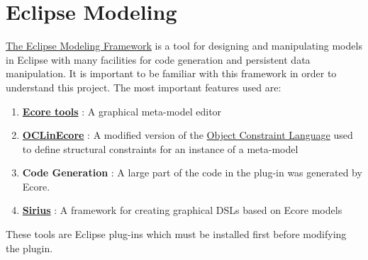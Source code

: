 \section{Eclipse Modeling}
\href{http://eclipse.org/modeling/emf/}{The Eclipse Modeling Framework}
is a tool for designing and manipulating models in Eclipse with many
facilities for code generation and persistent data manipulation. It is
important to be familiar with this framework in order to understand this
project. The most important features used are:
\begin{enumerate}
    \item \href{www.eclipse.org/ecoretools/}{\textbf{Ecore tools}} : A graphical meta-model editor
    \item \href{https://wiki.eclipse.org/OCL/OCLinEcore}{\textbf{OCLinEcore}} : A modified version of the \href{http://www.eclipse.org/modeling/mdt/?project=ocl}{Object Constraint Language} used to define structural constraints for an instance of a meta-model
    \item \textbf{Code Generation} : A large part of the code in the plug-in was generated by Ecore. 
    \item \href{http://www.eclipse.org/sirius/}{\textbf{Sirius}} : A framework for creating graphical DSLs based on Ecore models
\end{enumerate}
These tools are Eclipse plug-ins which must be installed first before
modifying the plugin.
